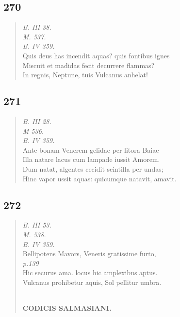 \documentclass[11pt, a4paper]{report}
\begin{document}
            \subsection*{270}
      \begin{verse}
      \textit{B. III 38.} \\ \textit{M. 537.} \\ \textit{B. IV 359.} \\ Quis deus has incendit aquas? quis fontibus ignes \\ Miscuit et madidas fecit decurrere flammas? \\ In regnis, Neptune, tuis Vulcanus anhelat! \\ 
      \end{verse}
  
            \subsection*{271}
      \begin{verse}
      \textit{B. III 28.} \\ \textit{M 536.} \\ \textit{B. IV 359.} \\ Ante bonam Venerem gelidae per litora Baiae \\ Illa natare lacus cum lampade iussit Amorem. \\ Dum natat, algentes cecidit scintilla per undas; \\ Hinc vapor ussit aquas: quicumque natavit, amavit. \\ 
      \end{verse}
  
            \subsection*{272}
      \begin{verse}
      \textit{B. III 53.} \\ \textit{M. 538.} \\ \textit{B. IV 359.} \\ Bellipotens Mavors, Veneris gratissime furto, \\ \textit{p.139} \\ Hic securus ama. locus hic amplexibus aptus. \\ Vulcanus prohibetur aquis, Sol pellitur umbra. \\ 
        ﻿\pagebreak 
    \begin{center} \textbf{CODICIS SALMASIANI.} \end{center}
      \end{verse}
  
\end{document}
